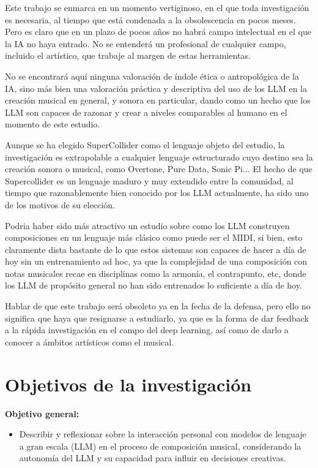 Este trabajo se enmarca en un momento vertiginoso, en el que toda investigación es necesaria, al tiempo que está condenada a la obsolescencia en pocos meses. Pero es claro que en un plazo de pocos años no habrá campo intelectual en el que la IA no haya entrado. No se entenderá un profesional de cualquier campo, incluido el artístico, que trabaje al margen de estas herramientas.

No se encontrará aquí ninguna valoración de índole ética o antropológica de la IA, sino más bien una valoración práctica y descriptiva del uso de los LLM en la creación musical en general, y sonora en particular, dando como un hecho que los LLM son capaces de razonar y crear a niveles comparables al humano en el momento de este estudio.

Aunque se ha elegido SuperCollider como el lenguaje objeto del estudio, la investigación es extrapolable a cualquier lenguaje estructurado cuyo destino sea la creación sonora o musical, como Overtone, Pure Data, Sonic Pi... El hecho de que Supercollider es un lenguaje maduro y muy extendido entre la comunidad, al tiempo que razonablemente bien conocido por los LLM actualmente, ha sido uno de los motivos de su elección.

Podria haber sido más atractivo un estudio sobre como los LLM construyen composiciones en un lenguaje más clásico como puede ser el MIDI, si bien, esto claramente dista bastante de lo que estos sistemas son capaces de hacer a día de hoy sin un entrenamiento ad hoc, ya que la complejidad de una composición con notas musicales recae en disciplinas como la armonía, el contrapunto, etc, donde los LLM de propósito general no han sido entrenados lo suficiente a día de hoy.


Hablar de que este trabajo será obsoleto ya en la fecha de la defensa, pero ello no significa que haya que resignarse a estudiarlo, ya que es la forma de dar feedback a la rápida investigación en el campo del deep learning, así como de darlo a conocer a ámbitos artísticos como el musical.


\section{Objetivos de la investigación}

\textbf{Objetivo general:}
\begin{itemize}
    \item Describir y reflexionar sobre la interacción personal con modelos de lenguaje a gran escala (LLM) en el proceso de composición musical, considerando la autonomía del LLM y su capacidad para influir en decisiones creativas.
\end{itemize}

